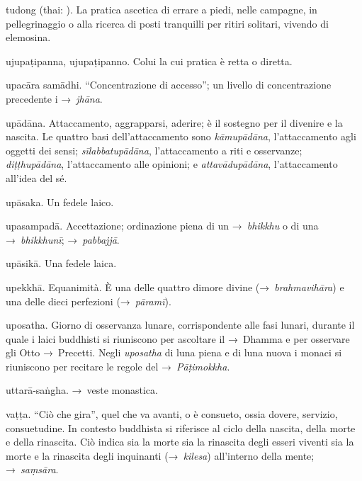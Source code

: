 \begin{glossarydescription}
\item[tudong] (thai: ). La pratica ascetica di errare a piedi, nelle
  campagne, in pellegrinaggio o alla ricerca di posti tranquilli per ritiri
  solitari, vivendo di elemosina.


\item[ujupaṭipanna, ujupaṭipanno.] Colui la cui pratica è retta o diretta.

\item[upacāra samādhi.] ``Concentrazione di accesso''; un livello di
  concentrazione precedente i →~\emph{jhāna}.

\item[upādāna.]\label{glossary-upadana} Attaccamento, aggrapparsi, aderire; è il sostegno per il
  divenire e la nascita. Le quattro basi dell'attaccamento sono
  \emph{kāmupādāna}, l'attaccamento agli oggetti dei sensi;
  \emph{sīlabbatupādāna}, l'attaccamento a riti e osservanze;
  \emph{diṭṭhupādāna}, l'attaccamento alle opinioni; e \emph{attavādupādāna},
  l'attaccamento all'idea del sé.

\item[upāsaka.] Un fedele laico.

\item[upasampadā.] Accettazione; ordinazione piena di un →~\emph{bhikkhu}
  o di una →~\emph{bhikkhunī}; →~\emph{pabbajjā}.

\item[upāsikā.] Una fedele laica.

\item[upekkhā.] Equanimità. È una delle quattro dimore divine
  (→~\emph{brahmavihāra}) e una delle dieci perfezioni (→~\emph{pāramī}).

\item[uposatha.] Giorno di osservanza lunare, corrispondente alle fasi
  lunari, durante il quale i laici buddhisti si riuniscono per ascoltare il
  →~Dhamma e per osservare gli Otto →~Precetti. Negli \emph{uposatha} di luna
  piena e di luna nuova i monaci si riuniscono per recitare le regole del
  →~\emph{Pāṭimokkha}.

\item[uttarā-saṅgha.] →~veste monastica.


\item[vaṭṭa.] ``Ciò che gira'', quel che va avanti, o è consueto, ossia
  dovere, servizio, consuetudine. In contesto buddhista si riferisce al ciclo
  della nascita, della morte e della rinascita. Ciò indica sia la morte sia la
  rinascita degli esseri viventi sia la morte e la rinascita degli inquinanti
  (→~\emph{kilesa}) all'interno della mente; →~\emph{saṃsāra}.


\end{glossarydescription}
